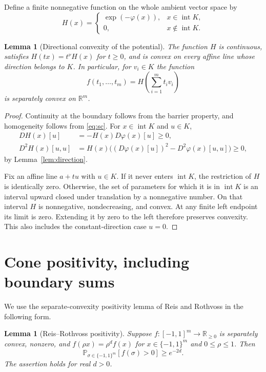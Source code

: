 \documentclass[11pt]{article}
\newtheorem{lemma}[theorem]{Lemma}
\newcommand{\R}{\mathbb R}
\newcommand{\Prb}{\mathbb P}
\newcommand{\intr}{\operatorname{int}}
\begin{document}
Define a finite nonnegative function on the whole ambient vector space by
\begin{equation}\label{eq:potential}
 H(x)=
 \begin{cases}
  \exp(-\varphi(x)),&x\in\intr K,\\
  0,&x\notin\intr K.
 \end{cases}
\end{equation}

\begin{lemma}[Directional convexity of the potential]\label{lem:potential}
The function $H$ is continuous, satisfies $H(tx)=t^\nu H(x)$ for
$t\ge0$, and is convex on every affine line whose direction belongs
to $K$. In particular, for $v_i\in K$ the function
\[
 f(t_1,\ldots,t_m)=H\left(\sum_{i=1}^m t_i v_i\right)
\]
is separately convex on $\R^m$.
\end{lemma}
\begin{proof}
Continuity at the boundary follows from the barrier property, and
homogeneity follows from \eqref{eq:sc}. For $x\in\intr K$ and $u\in K$,
\begin{align*}
 DH(x)[u]&=-H(x)D\varphi(x)[u]\ge0,\\
 D^2H(x)[u,u]
 &=H(x)\bigl((D\varphi(x)[u])^2-D^2\varphi(x)[u,u]\bigr)\ge0,
\end{align*}
by Lemma~\ref{lem:direction}.

Fix an affine line $a+tu$ with $u\in K$. If it never enters $\intr K$,
the restriction of $H$ is identically zero. Otherwise, the set of
parameters for which it is in $\intr K$ is an interval upward closed
under translation by a nonnegative number. On that interval $H$ is
nonnegative, nondecreasing, and convex. At any finite left endpoint
its limit is zero. Extending it by zero to the left therefore preserves
convexity. This also includes the constant-direction case $u=0$.
\end{proof}

\section{Cone positivity, including boundary sums}

We use the separate-convexity positivity lemma of
Reis and Rothvoss \cite[Lemma~18]{RR26} in the following form.

\begin{lemma}[Reis--Rothvoss positivity]\label{lem:rrpositive}
Suppose $f:[-1,1]^m\to\R_{\ge0}$ is separately convex, nonzero,
and $f(\rho x)=\rho^d f(x)$ for $x\in\{-1,1\}^m$ and
$0\le\rho\le1$. Then
\[
 \Prb_{\sigma\in\{-1,1\}^m}[f(\sigma)>0]\ge e^{-2d}.
\]
The assertion holds for real $d>0$.
\end{lemma}
\end{document}
